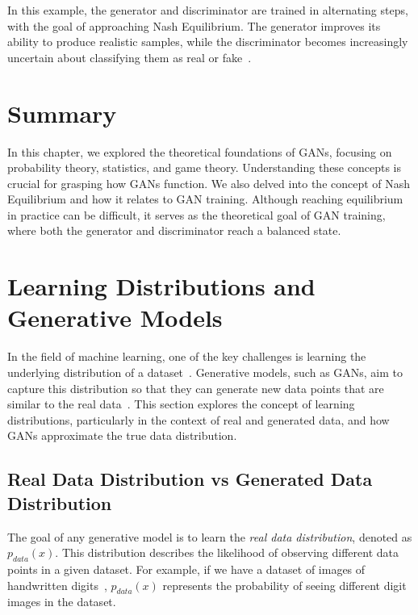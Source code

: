 In this example, the generator and discriminator are trained in alternating steps, with the goal of approaching Nash Equilibrium. The generator improves its ability to produce realistic samples, while the discriminator becomes increasingly uncertain about classifying them as real or fake~\cite{farnia2020gans}.

\section{Summary}
In this chapter, we explored the theoretical foundations of GANs, focusing on probability theory, statistics, and game theory. Understanding these concepts is crucial for grasping how GANs function. We also delved into the concept of Nash Equilibrium and how it relates to GAN training. Although reaching equilibrium in practice can be difficult, it serves as the theoretical goal of GAN training, where both the generator and discriminator reach a balanced state.










\section{Learning Distributions and Generative Models}
In the field of machine learning, one of the key challenges is learning the underlying distribution of a dataset~\cite{quinonero2022dataset}. Generative models, such as GANs, aim to capture this distribution so that they can generate new data points that are similar to the real data~\cite{goodfellow2014generative}. This section explores the concept of learning distributions, particularly in the context of real and generated data, and how GANs approximate the true data distribution.

\subsection{Real Data Distribution vs Generated Data Distribution}
The goal of any generative model is to learn the \textit{real data distribution}, denoted as \( p_{data}(x) \). This distribution describes the likelihood of observing different data points in a given dataset. For example, if we have a dataset of images of handwritten digits~\cite{lecun1998gradient}, \( p_{data}(x) \) represents the probability of seeing different digit images in the dataset.

